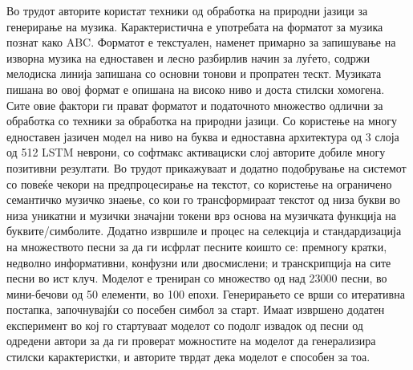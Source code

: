 Во трудот \cite{Sturm2016} авторите користат техники од обработка на природни јазици за генерирање на музика. Карактеристична е употребата на форматот за музика познат како ABC. Форматот е текстуален, наменет примарно за запишување на изворна музика на едноставен и лесно разбирлив начин за луѓето, содржи мелодиска линија запишана со основни тонови и пропратен тескт. Музиката пишана во овој формат е опишана на високо ниво и доста стилски хомогена. Сите овие фактори ги прават форматот и податочното множество одлични за обработка со техники за обработка на природни јазици. Со користење на многу едноставен јазичен модел на ниво на буква и едноставна архитектура од 3 слоја од 512 LSTM неврони, со софтмакс активациски слој авторите добиле многу позитивни резултати. Во трудот прикажуваат и додатно подобрување на системот со повеќе чекори на предпроцесирање на текстот, со користење на ограничено семантичко музичко знаење, со кои го трансформираат текстот од низа букви во низа уникатни и музички значајни токени врз основа на музичката функција на буквите/симболите. Додатно извршиле и процес на селекција и стандардизација на множеството песни за да ги исфрлат песните коишто се: премногу кратки, недволно информативни, конфузни или двосмислени; и транскрипција на сите песни во ист клуч. Моделот е трениран со множество од над 23000 песни, во мини-бечови од 50 елементи, во 100 епохи. Генерирањето се врши со итеративна постапка, започнувајќи со посебен симбол за старт. Имаат извршено додатен експеримент во кој го стартуваат моделот со подолг извадок од песни од одредени автори за да ги проверат можностите на моделот да генерализира стилски карактеристки, и авторите тврдат дека моделот е способен за тоа.


